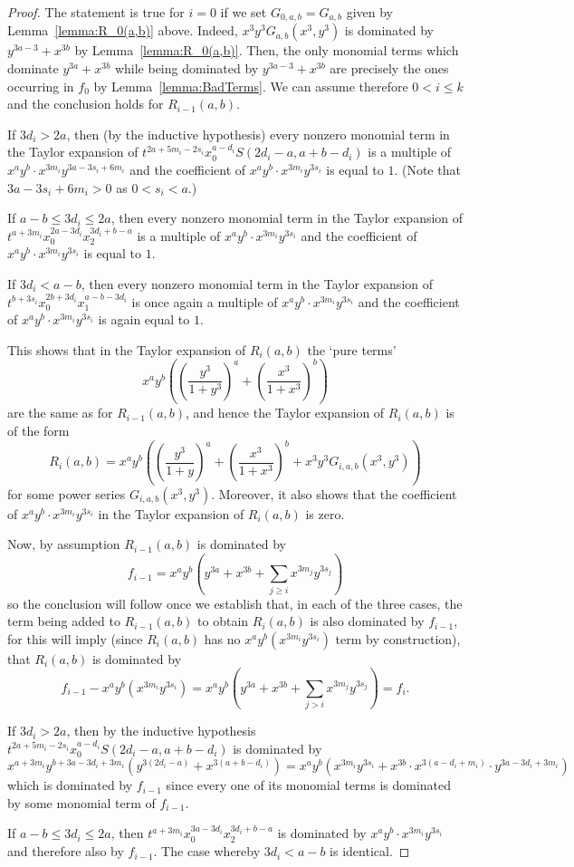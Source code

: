 \documentclass{article}
\begin{document}
\begin{proof}
The statement is true for $i=0$ if we set $G_{0,a,b} = G_{a,b}$ given by Lemma~\ref{lemma:R_0(a,b)} above. Indeed, $x^3y^3G_{a,b}(x^3,y^3)$ is dominated by $y^{3a-3}+x^{3b}$ by Lemma~\ref{lemma:R_0(a,b)}. Then, the only monomial terms which dominate $y^{3a}+x^{3b}$ while being dominated by $y^{3a-3}+x^{3b}$ are precisely the ones occurring in $f_0$ by Lemma~\ref{lemma:BadTerms}. We can assume therefore $0<i\leq k$ and the conclusion holds for $R_{i-1}(a,b)$.

If $3d_i>2a$, then (by the inductive hypothesis) every nonzero monomial term in the Taylor expansion of $t^{2a+5m_i-2s_i}x_0^{a-d_i}S(2d_i-a,a+b-d_i)$ is a multiple of $x^ay^b\cdot x^{3m_i}y^{3a-3s_i+6m_i}$ and the coefficient of $x^ay^b\cdot x^{3m_i}y^{3s_i}$ is equal to $1$. (Note that $3a-3s_i+6m_i > 0$ as $0<s_i<a$.)

If $a-b\leq 3d_i\leq 2a$, then every nonzero monomial term in the Taylor expansion of $t^{a+3m_i}x_0^{2a-3d_i}x_2^{3d_i+b-a}$ is a multiple of $x^ay^b\cdot x^{3m_i}y^{3s_i}$ and the coefficient of $x^ay^b\cdot x^{3m_i}y^{3s_i}$ is equal to $1$.

If $3d_i<a-b$, then every nonzero monomial term in the Taylor expansion of $t^{b+3s_i}x_0^{2b+3d_i}x_1^{a-b-3d_i}$ is once again a multiple of $x^ay^b\cdot x^{3m_i}y^{3s_i}$ and the coefficient of $x^ay^b\cdot x^{3m_i}y^{3s_i}$ is again equal to $1$. 

This shows that in the Taylor expansion of $R_i(a,b)$ the `pure terms'
\[
x^ay^b \left(\left(\frac{y^3}{1+y^3}\right)^a + \left(\frac{x^3}{1+x^3}\right)^b\right)
\]
are the same as for $R_{i-1}(a,b)$, and hence the Taylor expansion of $R_i(a,b)$ is of the form 
\[
R_i(a,b)=x^ay^b\left(\left(\frac{y^3}{1+y}\right)^{a}+\left(\frac{x^3}{1+x^3}\right)^{b}+x^3y^3G_{i,a,b}(x^3,y^3)\right)
\]
for some power series $G_{i,a,b}(x^3,y^3)$. Moreover, it also shows that the coefficient of $x^ay^b\cdot x^{3m_i}y^{3s_i}$ in the Taylor expansion of $R_i(a,b)$ is zero. 

Now, by assumption $R_{i-1}(a,b)$ is dominated by
\[f_{i-1}=x^ay^b(y^{3a}+x^{3b} + \sum_{j\geq i}x^{3m_j}y^{3s_j})
\]
so the conclusion will follow once we establish that, in each of the three cases, the term being added to $R_{i-1}(a,b)$ to obtain $R_i(a,b)$ is also dominated by $f_{i-1}$, for this will imply (since $R_i(a,b)$ has no $x^ay^b(x^{3m_i}y^{3s_i})$ term by construction), that $R_i(a,b)$ is dominated by 
\[f_{i-1}-x^ay^b(x^{3m_i}y^{3s_i})= x^ay^b(y^{3a}+x^{3b} + \sum_{j> i}x^{3m_j}y^{3s_j}) = f_i.\]

If $3d_i>2a$, then by the inductive hypothesis $t^{2a+5m_i-2s_i}x_0^{a-d_i}S(2d_i-a,a+b-d_i)$ is dominated by 
\[
x^{a+3m_i}y^{b+3a-3d_i+3m_i}(y^{3(2d_i-a)}+x^{3(a+b-d_i)}) = x^{a}y^{b}(x^{3m_i}y^{3s_i}+x^{3b}\cdot x^{3(a-d_i+m_i)}\cdot y^{3a-3d_i+3m_i})
\]
which is dominated by $f_{i-1}$ since every one of its monomial terms is dominated by some monomial term of $f_{i-1}$. 

If $a-b\leq 3d_i \leq 2a$, then $t^{a+3m_i}x_0^{3a-3d_i}x_2^{3d_i+b-a}$ is dominated by $x^ay^b\cdot x^{3m_i}y^{3s_i}$ and therefore also by $f_{i-1}$. The case whereby $3d_i<a-b$ is identical.
\end{proof}
\end{document}
